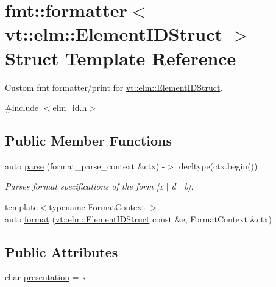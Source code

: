 \hypertarget{structfmt_1_1formatter_3_01vt_1_1elm_1_1_element_i_d_struct_01_4}{}\section{fmt\+:\+:formatter$<$ vt\+:\+:elm\+:\+:Element\+I\+D\+Struct $>$ Struct Template Reference}
\label{structfmt_1_1formatter_3_01vt_1_1elm_1_1_element_i_d_struct_01_4}


Custom fmt formatter/print for {\ttfamily \hyperlink{structvt_1_1elm_1_1_element_i_d_struct}{vt\+::elm\+::\+Element\+I\+D\+Struct}}.  




{\ttfamily \#include $<$elm\+\_\+id.\+h$>$}

\subsection*{Public Member Functions}
\begin{DoxyCompactItemize}
\item 
auto \hyperlink{structfmt_1_1formatter_3_01vt_1_1elm_1_1_element_i_d_struct_01_4_ab44d6b97885decc43c9f74e0a11e3c26}{parse} (format\+\_\+parse\+\_\+context \&ctx) -\/$>$ decltype(ctx.\+begin())
\begin{DoxyCompactList}\small\item\em Parses format specifications of the form \mbox{[}\textquotesingle{}x\textquotesingle{} $\vert$ \textquotesingle{}d\textquotesingle{} $\vert$ \textquotesingle{}b\textquotesingle{}\mbox{]}. \end{DoxyCompactList}\item 
{\footnotesize template$<$typename Format\+Context $>$ }\\auto \hyperlink{structfmt_1_1formatter_3_01vt_1_1elm_1_1_element_i_d_struct_01_4_ac15c4718267371ae183ef4604a0da66f}{format} (\hyperlink{structvt_1_1elm_1_1_element_i_d_struct}{vt\+::elm\+::\+Element\+I\+D\+Struct} const \&e, Format\+Context \&ctx)
\end{DoxyCompactItemize}
\subsection*{Public Attributes}
\begin{DoxyCompactItemize}
\item 
char \hyperlink{structfmt_1_1formatter_3_01vt_1_1elm_1_1_element_i_d_struct_01_4_a6979043e4d0ca6f3e88da60c5848d8b1}{presentation} = \textquotesingle{}x\textquotesingle{}
\end{DoxyCompactItemize}


